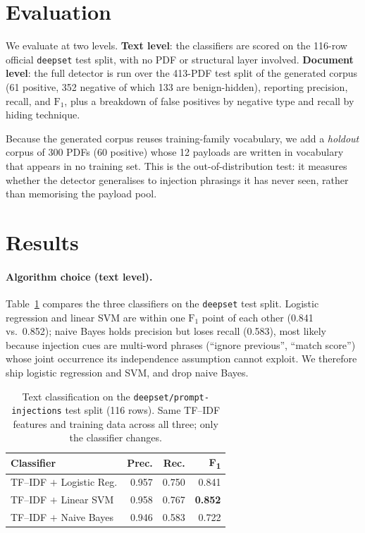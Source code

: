 \documentclass[11pt]{article}
\begin{document}
\section{Evaluation}
\label{sec:evaluation}

We evaluate at two levels. \textbf{Text level}: the classifiers are scored on
the 116-row official \texttt{deepset} test split, with no PDF or structural
layer involved. \textbf{Document level}: the full detector is run over the
413-PDF test split of the generated corpus (61 positive, 352 negative of which
133 are benign-hidden), reporting precision, recall, and $\text{F}_1$, plus a
breakdown of false positives by negative type and recall by hiding technique.

Because the generated corpus reuses training-family vocabulary, we add a
\emph{holdout} corpus of 300 PDFs (60 positive) whose 12 payloads are written in
vocabulary that appears in no training set. This is the out-of-distribution
test: it measures whether the detector generalises to injection phrasings it has
never seen, rather than memorising the payload pool.

\section{Results}
\label{sec:results}

\paragraph{Algorithm choice (text level).}
Table~\ref{tab:algos} compares the three classifiers on the \texttt{deepset}
test split. Logistic regression and linear SVM are within one $\text{F}_1$ point
of each other (0.841 vs.\ 0.852); naive Bayes holds precision but loses recall
(0.583), most likely because injection cues are multi-word phrases (``ignore
previous'', ``match score'') whose joint occurrence its independence assumption
cannot exploit. We therefore ship logistic regression and SVM, and drop naive
Bayes.

\begin{table}[t]
  \centering
  \small
  \begin{tabular}{lrrr}
    \toprule
    \textbf{Classifier} & \textbf{Prec.} & \textbf{Rec.} & \textbf{F\textsubscript{1}} \\
    \midrule
    TF--IDF $+$ Logistic Reg. & 0.957 & 0.750 & 0.841 \\
    TF--IDF $+$ Linear SVM    & 0.958 & 0.767 & \textbf{0.852} \\
    TF--IDF $+$ Naive Bayes   & 0.946 & 0.583 & 0.722 \\
    \bottomrule
  \end{tabular}
  \caption{Text classification on the \texttt{deepset/prompt-injections} test
  split (116 rows). Same TF--IDF features and training data across all three;
  only the classifier changes.}
  \label{tab:algos}
\end{table}
\end{document}
